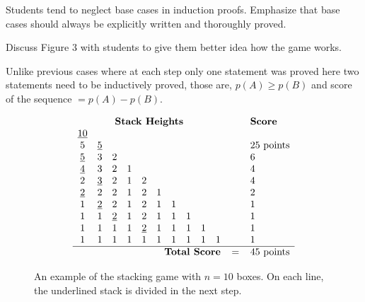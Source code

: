 \documentclass[handout]{mcs}
\begin{document}


\begin{staffnotes}
Students tend to neglect base cases in induction proofs. Emphasize that base cases should always be explicitly written and thoroughly proved.
\end{staffnotes}

\begin{staffnotes}
Discuss Figure 3 with students to give them better idea how the game works.

Unlike previous cases where at each step only one statement was proved here two statements need to be inductively proved, those are, $p(A)\ge p(B)$ and score of the sequence $=p(A)-p(B)$.
\end{staffnotes}



\examspace

\begin{figure}\redrawntrue
\[
\begin{array}{cccccccccccl}
\multicolumn{10}{c}{\textbf{Stack Heights}} & \quad & \textbf{Score} \\
\underline{10}&&&&&&&&& && \\
5&\underline{5}&&&&&&&& && 25 \text{ points} \\
\underline{5}&3&2&&&&&&& && 6 \\
\underline{4}&3&2&1&&&&&& && 4 \\
2&\underline{3}&2&1&2&&&&& && 4 \\
\underline{2}&2&2&1&2&1&&&& && 2 \\
1&\underline{2}&2&1&2&1&1&&& && 1 \\
1&1&\underline{2}&1&2&1&1&1&& && 1 \\
1&1&1&1&\underline{2}&1&1&1&1& && 1 \\
1&1&1&1&1&1&1&1&1&1 && 1 \\ \hline
\multicolumn{10}{r}{\textbf{Total Score}} & = & 45 \text{ points}
\end{array}
\]
\caption{An example of the stacking game with $n = 10$ boxes.  On each
line, the underlined stack is divided in the next step.}
\label{fig:stacking-10}
\end{figure}


\end{document}
